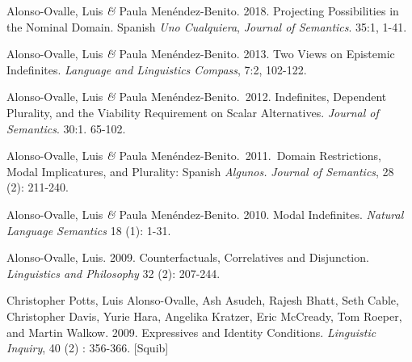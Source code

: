 \documentclass[11pt]{article}
\begin{document}
Alonso-Ovalle, Luis \textit{\&} Paula Men\'endez-Benito. 2018. Projecting Possibilities in the Nominal Domain. Spanish \textit{Uno Cualquiera}, \textit{Journal of Semantics}. 35:1, 1-41. %


Alonso-Ovalle, Luis \textit{\&} Paula
    Men\'endez-Benito. 2013. Two Views on Epistemic
    Indefinites. \textit{Language and Linguistics Compass}, 7:2, 102-122. 

Alonso-Ovalle, Luis \textit{\&} Paula
    Men\'endez-Benito.\ 2012. Indefinites, Dependent Plurality, and
    the Viability Requirement on Scalar Alternatives. \textit{Journal
      of Semantics}. 30:1. 65-102. %

Alonso-Ovalle, Luis \textit{\&} Paula
    Men\'endez-Benito.\ 2011.\ Domain Restrictions, Modal
    Implicatures, and Plurality: Spanish \textit{Algunos.}
    \textit{Journal of Semantics}, 28 (2): 211-240.


Alonso-Ovalle, Luis \textit{\&} Paula
    Men\'endez-Benito. 2010. Modal Indefinites. \textit{Natural
      Language Semantics} 18 (1): 1-31. 

Alonso-Ovalle, Luis. 2009. Counterfactuals,
  Correlatives and Disjunction. \textit{Linguistics and Philosophy} 32 (2): 207-244.


Christopher Potts, Luis Alonso-Ovalle, Ash Asudeh,
    Rajesh Bhatt, Seth Cable, Christopher Davis, Yurie Hara, Angelika
    Kratzer, Eric McCready, Tom Roeper, and Martin Walkow. 2009. 
  Expressives and Identity Conditions. \textit{Linguistic Inquiry}, 40
  (2) : 356-366. [Squib]
\end{document}
